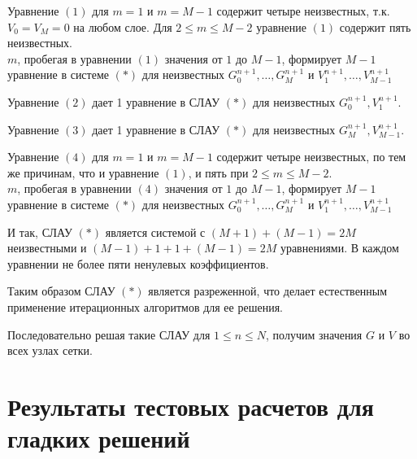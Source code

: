 \documentclass[11pt]{article}
\begin{document}
Уравнение $(1)$ для $m = 1$ и $m=M-1$ содержит четыре неизвестных, т.к. $V_0 = V_M = 0$ на любом слое. Для $2 \leqslant m \leqslant M - 2$ уравнение $(1)$ содержит пять неизвестных.\\ 
$m$, пробегая в уравнении $(1)$ значения от $1$ до $M - 1$, формирует $M-1$ уравнение в системе $(*)$ для неизвестных $G_0^{n+1}, \ldots , G_M^{n+1}$ и $V_1^{n+1}, \ldots , V_{M-1}^{n+1}$

Уравнение $(2)$ дает 1 уравнение в СЛАУ $(*)$ для неизвестных $G_0^{n+1}, V_1^{n+1}$.

Уравнение $(3)$ дает 1 уравнение в СЛАУ $(*)$ для неизвестных $G_M^{n+1}, V_{M-1}^{n+1}$.

Уравнение $(4)$ для $m =1$ и $m = M-1$ содержит четыре неизвестных, по тем же причинам, что и уравнение $(1)$, и пять при $2 \leqslant m \leqslant M - 2$.\\
$m$, пробегая в уравнении $(4)$ значения от $1$ до $M - 1$, формирует $M-1$ уравнение в системе $(*)$ для неизвестных $G_0^{n+1}, \ldots , G_M^{n+1}$ и $V_1^{n+1}, \ldots , V_{M-1}^{n+1}$

И так, СЛАУ $(*)$ является системой с $(M+1) + (M-1) = 2M$ неизвестными и $(M-1) + 1 + 1 + (M-1) = 2M$ уравнениями. В каждом уравнении не более пяти ненулевых коэффициентов.

Таким образом СЛАУ $(*)$ является разреженной, что делает естественным применение итерационных алгоритмов для ее решения.

Последовательно решая такие СЛАУ для $1 \leqslant n \leqslant N$, получим значения $G$ и $V$ во всех узлах сетки.

\section{Результаты тестовых расчетов для гладких решений}
\end{document}

